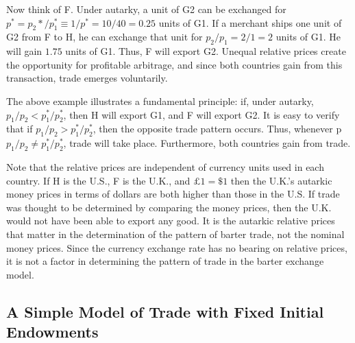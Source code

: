 Now think of F. Under autarky, a unit of G2 can be exchanged for $p^* = p_2* / p_1^* \equiv 1/p^* = 10/40 = 0.25$ units of G1. If a merchant ships one unit of G2 from F to H, he can exchange that unit for $p_2 / p_1 = 2/1 = 2$ units of G1. He will gain $1.75$ units of G1. Thus, F will export G2. Unequal relative prices create the opportunity for profitable arbitrage, and since both countries gain from this transaction, trade emerges voluntarily.

The above example illustrates a fundamental principle: if, under autarky, $p_1 / p_2 < p_1^* / p_2^*$, then H will export G1, and F will export G2. It is easy to verify that if $p_1 / p_2 > p_1^* / p_2^*$, then the opposite trade pattern occurs. Thus, whenever p $p_1 / p_2 \neq p_1^* / p_2^*$, trade will take place. Furthermore, both countries gain from trade.

Note that the relative prices are independent of currency units used in each country. If H is the U.S., F is the U.K., and $£ 1=\$ 1$ then the U.K.'s autarkic money prices in terms of dollars are both higher than those in the U.S. If trade was thought to be determined by comparing the money prices, then the U.K. would not have been able to export any good. It is the autarkic relative prices that matter in the determination of the pattern of barter trade, not the nominal money prices. Since the currency exchange rate has no bearing on relative prices, it is not a factor in determining the pattern of trade in the barter exchange model.

\subsection{A Simple Model of Trade with Fixed Initial Endowments}


